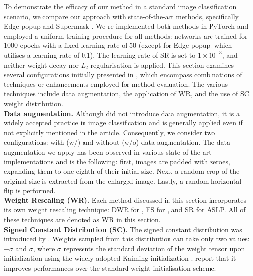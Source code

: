 To demonstrate the efficacy of our method in a standard image classification
scenario, we compare our approach with state-of-the-art methods, specifically
Edge-popup \cite{DBLP:conf/cvpr/RamanujanWKFR20} and Supermask
\cite{DBLP:conf/nips/ZhouLLY19}. We re-implemented both methods in PyTorch
\cite{DBLP:conf/nips/PaszkeGMLBCKLGA19} and employed a uniform training
procedure for all methods: networks are trained for 1000 epochs with a fixed
learning rate of 50 (except for Edge-popup, which utilises a learning rate of
0.1). The learning rate of \ac{SR} is set to $1\times10^{-3}$, and  neither
weight decay nor $L_2$ regularisation is applied. This section examines
several configurations initially presented in \cite{DBLP:conf/nips/ZhouLLY19},
which encompass combinations of techniques or enhancements employed for method
evaluation. The various techniques include data augmentation, the application of
\ac{WR}, and the use of \ac{SC} weight distribution.\\

\noindent\textbf{Data augmentation.} Although \cite{DBLP:conf/nips/ZhouLLY19}
did not introduce data augmentation, it is a widely accepted practice in image
classification and is generally applied even if not explicitly mentioned in the
article. Consequently, we consider two configurations: with (w/) and without
(w/o) data augmentation. The data augmentation we apply has been observed in
various state-of-the-art implementations and is the following: first, images
are padded with zeroes, expanding them to one-eighth of their initial size.
Next, a random crop of the original size is extracted from the enlarged image.
Lastly, a random horizontal flip is performed.\\

\noindent\textbf{Weight Rescaling (WR).} Each method discussed in this section
incorporates its own weight rescaling technique: \ac{DWR} for
\cite{DBLP:conf/nips/ZhouLLY19}, \ac{FS} for
\cite{DBLP:conf/cvpr/RamanujanWKFR20}, and \ac{SR} for \ac{ASLP}. All of these
techniques are denoted as \ac{WR} in this section.\\ 

\noindent\textbf{Signed Constant Distribution (SC).} The signed constant distribution
was introduced by \cite{DBLP:conf/nips/ZhouLLY19}. Weights sampled from this
distribution can take only two values: $-\sigma$ and $\sigma$, where $\sigma$
represents the standard deviation of the weight tensor upon initialization using
the widely adopted Kaiming initialization \cite{DBLP:conf/iccv/HeZRS15}.
\citeauthor{DBLP:conf/nips/ZhouLLY19} report that it improves performances over
the standard weight initialisation scheme. \\


